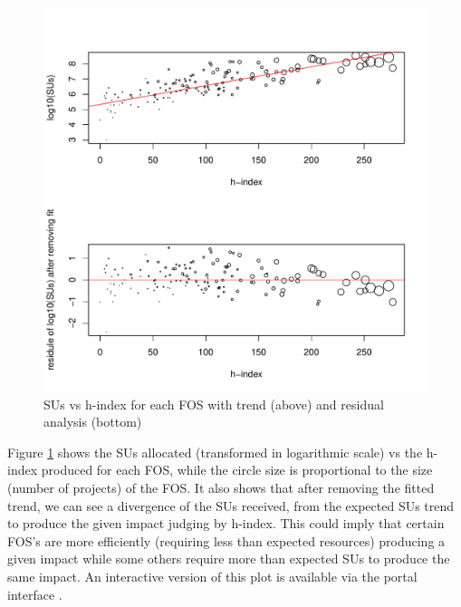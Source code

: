 \documentclass{sig-alternate}
\begin{document}
\begin{figure}[!htb] 
  \centering 
    \includegraphics[width=1.0\columnwidth]{images/05_alloc_vs_hindex_fos_sized_2in1.pdf} 
  \caption{SUs vs h-index for each FOS with trend (above) and residual analysis (bottom)}\label{F:alloc-vs-hindex-fos-sized} 
\end{figure} 

Figure \ref{F:alloc-vs-hindex-fos-sized} shows the SUs allocated (transformed in logarithmic scale) vs the h-index produced for each FOS, while the circle size is proportional to the size (number of projects) of the FOS. It also shows that after removing the fitted trend, we can see a divergence of the SUs received, from the expected SUs trend to produce the given impact judging by h-index. This could imply that certain FOS's are more efficiently (requiring less than expected resources) producing a given impact while some others require more than expected SUs to produce the same impact. An interactive version of this plot is available via the portal interface \cite{www-tasdeviu}.
\end{document}
